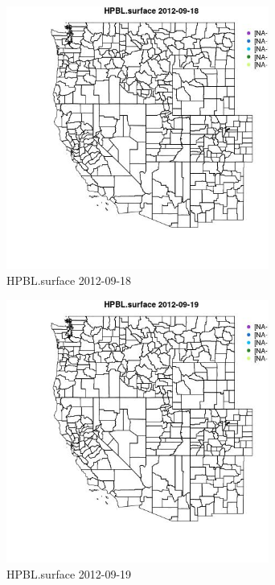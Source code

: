 \begin{figure} 
\centering  
\includegraphics[width=0.77\textwidth]{Code_Outputs/ML_input_report_ML_input_PM25_Step5_part_d_de_duplicated_aves_ML_input_MapObsHPBLsurface2012-09-18.jpg} 
\caption{\label{fig:ML_input_report_ML_input_PM25_Step5_part_d_de_duplicated_aves_ML_inputMapObsHPBLsurface2012-09-18}HPBL.surface 2012-09-18} 
\end{figure} 
 

\begin{figure} 
\centering  
\includegraphics[width=0.77\textwidth]{Code_Outputs/ML_input_report_ML_input_PM25_Step5_part_d_de_duplicated_aves_ML_input_MapObsHPBLsurface2012-09-19.jpg} 
\caption{\label{fig:ML_input_report_ML_input_PM25_Step5_part_d_de_duplicated_aves_ML_inputMapObsHPBLsurface2012-09-19}HPBL.surface 2012-09-19} 
\end{figure} 
 

